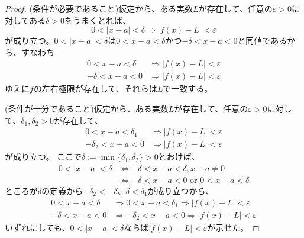 \begin{proof}
  (条件が必要であること)仮定から、ある実数$L$が存在して、任意の$\varepsilon>0$に対してある$\delta>0$をうまくとれば、
  \[
    0<|x-a|<\delta\Rightarrow|f(x)-L|<\varepsilon
  \]
  が成り立つ。$0<|x-a|<\delta$は$0<x-a<\delta$かつ$-\delta<x-a<0$と同値であるから、すなわち
  \begin{align*}
    0<x-a<\delta&\Rightarrow|f(x)-L|<\varepsilon\\
    -\delta<x-a<0&\Rightarrow|f(x)-L|<\varepsilon
  \end{align*}
  ゆえに$f$の左右極限が存在して、それらは$L$で一致する。

  (条件が十分であること)仮定から、ある実数$L$が存在して、任意の$\varepsilon>0$に対して、$\delta_1,\delta_2>0$が存在して、
  \begin{align*}
    0<x-a<\delta_1&\Rightarrow|f(x)-L|<\varepsilon\\
    -\delta_2<x-a<0&\Rightarrow|f(x)-L|<\varepsilon
  \end{align*}
  が成り立つ。
  ここで$\delta:=\min\{\delta_1,\delta_2\}>0$とおけば、
  \begin{align*}
    0<|x-a|<\delta&\Leftrightarrow-\delta<x-a<\delta,x-a\neq0\\
    &\Leftrightarrow-\delta<x-a<0 \text{ or } 0<x-a<\delta
  \end{align*}
  ところが$\delta$の定義から$-\delta_2<-\delta$、$\delta<\delta_1$が成り立つから、
  \begin{align*}
    0<x-a<\delta&\Rightarrow0<x-a<\delta_1\Rightarrow|f(x)-L|<\varepsilon\\
    -\delta<x-a<0&\Rightarrow-\delta_2<x-a<0\Rightarrow|f(x)-L|<\varepsilon
  \end{align*}
  いずれにしても、$0<|x-a|<\delta$ならば$|f(x)-L|<\varepsilon$が示せた。
\end{proof}

